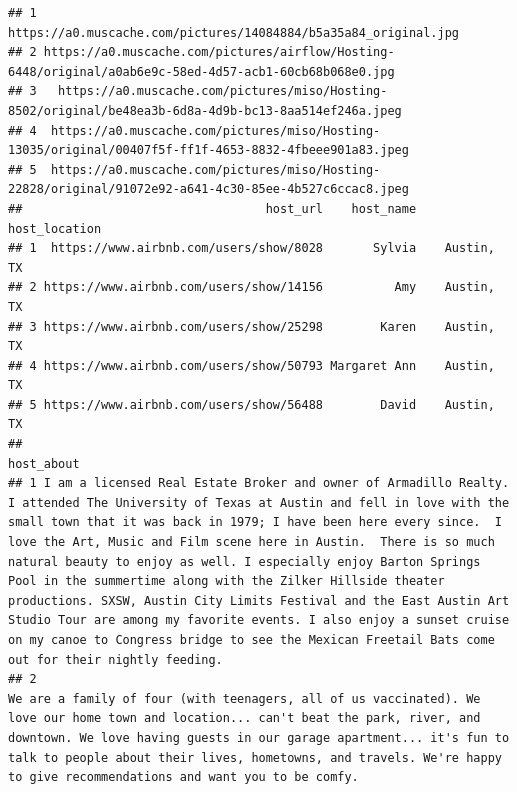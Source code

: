 \documentclass[
]{article}
\begin{document}
\begin{verbatim}
## 1                                         https://a0.muscache.com/pictures/14084884/b5a35a84_original.jpg
## 2 https://a0.muscache.com/pictures/airflow/Hosting-6448/original/a0ab6e9c-58ed-4d57-acb1-60cb68b068e0.jpg
## 3   https://a0.muscache.com/pictures/miso/Hosting-8502/original/be48ea3b-6d8a-4d9b-bc13-8aa514ef246a.jpeg
## 4  https://a0.muscache.com/pictures/miso/Hosting-13035/original/00407f5f-ff1f-4653-8832-4fbeee901a83.jpeg
## 5  https://a0.muscache.com/pictures/miso/Hosting-22828/original/91072e92-a641-4c30-85ee-4b527c6ccac8.jpeg
##                                  host_url    host_name host_location
## 1  https://www.airbnb.com/users/show/8028       Sylvia    Austin, TX
## 2 https://www.airbnb.com/users/show/14156          Amy    Austin, TX
## 3 https://www.airbnb.com/users/show/25298        Karen    Austin, TX
## 4 https://www.airbnb.com/users/show/50793 Margaret Ann    Austin, TX
## 5 https://www.airbnb.com/users/show/56488        David    Austin, TX
##                                                                                                                                                                                                                                                                                                                                                                                                                                                                                                                                                                                                                                                                  host_about
## 1 I am a licensed Real Estate Broker and owner of Armadillo Realty.  I attended The University of Texas at Austin and fell in love with the small town that it was back in 1979; I have been here every since.  I love the Art, Music and Film scene here in Austin.  There is so much natural beauty to enjoy as well. I especially enjoy Barton Springs Pool in the summertime along with the Zilker Hillside theater productions. SXSW, Austin City Limits Festival and the East Austin Art Studio Tour are among my favorite events. I also enjoy a sunset cruise on my canoe to Congress bridge to see the Mexican Freetail Bats come out for their nightly feeding.  
## 2                                                                                                                                                                                                                                                                                                                                      We are a family of four (with teenagers, all of us vaccinated). We love our home town and location... can't beat the park, river, and downtown. We love having guests in our garage apartment... it's fun to talk to people about their lives, hometowns, and travels. We're happy to give recommendations and want you to be comfy.

\end{verbatim}
\end{document}

